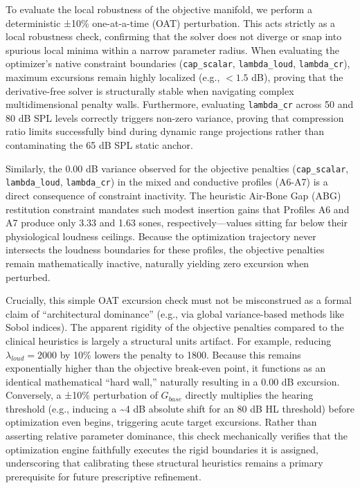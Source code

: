 \documentclass[
  12pt,
]{article}
\begin{document}
To evaluate the local robustness of the objective manifold, we perform a
deterministic ±10\% one-at-a-time (OAT) perturbation. This acts strictly
as a local robustness check, confirming that the solver does not diverge
or snap into spurious local minima within a narrow parameter radius.
When evaluating the optimizer's native constraint boundaries
(\texttt{cap\_scalar}, \texttt{lambda\_loud}, \texttt{lambda\_cr}),
maximum excursions remain highly localized (e.g., \(< 1.5\) dB), proving
that the derivative-free solver is structurally stable when navigating
complex multidimensional penalty walls. Furthermore, evaluating
\texttt{lambda\_cr} across 50 and 80 dB SPL levels correctly triggers
non-zero variance, proving that compression ratio limits successfully
bind during dynamic range projections rather than contaminating the 65
dB SPL static anchor.

Similarly, the 0.00 dB variance observed for the objective penalties
(\texttt{cap\_scalar}, \texttt{lambda\_loud}, \texttt{lambda\_cr}) in
the mixed and conductive profiles (A6-A7) is a direct consequence of
constraint inactivity. The heuristic Air-Bone Gap (ABG) restitution
constraint mandates such modest insertion gains that Profiles A6 and A7
produce only 3.33 and 1.63 sones, respectively---values sitting far
below their physiological loudness ceilings. Because the optimization
trajectory never intersects the loudness boundaries for these profiles,
the objective penalties remain mathematically inactive, naturally
yielding zero excursion when perturbed.

Crucially, this simple OAT excursion check must not be misconstrued as a
formal claim of ``architectural dominance'' (e.g., via global
variance-based methods like Sobol indices). The apparent rigidity of the
objective penalties compared to the clinical heuristics is largely a
structural units artifact. For example, reducing
\(\lambda_{loud} = 2000\) by 10\% lowers the penalty to 1800. Because
this remains exponentially higher than the objective break-even point,
it functions as an identical mathematical ``hard wall,'' naturally
resulting in a 0.00 dB excursion. Conversely, a ±10\% perturbation of
\(G_{base}\) directly multiplies the hearing threshold (e.g., inducing a
\textasciitilde4 dB absolute shift for an 80 dB HL threshold) before
optimization even begins, triggering acute target excursions. Rather
than asserting relative parameter dominance, this check mechanically
verifies that the optimization engine faithfully executes the rigid
boundaries it is assigned, underscoring that calibrating these
structural heuristics remains a primary prerequisite for future
prescriptive refinement.
\end{document}
